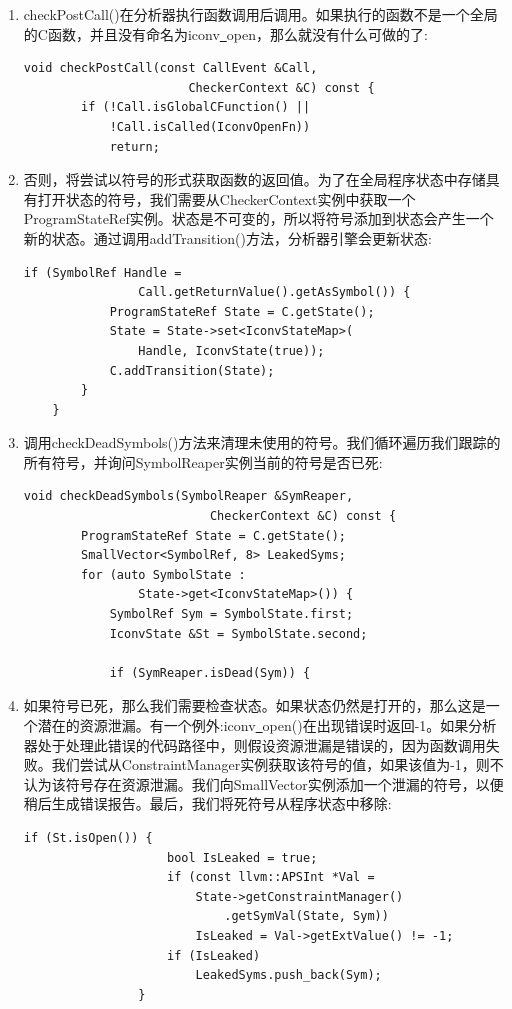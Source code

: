 \begin{enumerate}
\item checkPostCall()在分析器执行函数调用后调用。如果执行的函数不是一个全局的C函数，并且没有命名为iconv\underline{~}open，那么就没有什么可做的了:
\begin{lstlisting}[caption={}]
	void checkPostCall(const CallEvent &Call,
					   CheckerContext &C) const {
		if (!Call.isGlobalCFunction() ||
			!Call.isCalled(IconvOpenFn))
			return;
\end{lstlisting}

\item 否则，将尝试以符号的形式获取函数的返回值。为了在全局程序状态中存储具有打开状态的符号，我们需要从CheckerContext实例中获取一个ProgramStateRef实例。状态是不可变的，所以将符号添加到状态会产生一个新的状态。通过调用addTransition()方法，分析器引擎会更新状态:
\begin{lstlisting}[caption={}]
	if (SymbolRef Handle =
				Call.getReturnValue().getAsSymbol()) {
			ProgramStateRef State = C.getState();
			State = State->set<IconvStateMap>(
				Handle, IconvState(true));
			C.addTransition(State);
		}
	}
\end{lstlisting}

\item 调用checkDeadSymbols()方法来清理未使用的符号。我们循环遍历我们跟踪的所有符号，并询问SymbolReaper实例当前的符号是否已死:\par
\begin{lstlisting}[caption={}]
	void checkDeadSymbols(SymbolReaper &SymReaper,
						  CheckerContext &C) const {
		ProgramStateRef State = C.getState();
		SmallVector<SymbolRef, 8> LeakedSyms;
		for (auto SymbolState :
				State->get<IconvStateMap>()) {
			SymbolRef Sym = SymbolState.first;
			IconvState &St = SymbolState.second;
			
			if (SymReaper.isDead(Sym)) {
\end{lstlisting}

\item 如果符号已死，那么我们需要检查状态。如果状态仍然是打开的，那么这是一个潜在的资源泄漏。有一个例外:iconv\underline{~}open()在出现错误时返回-1。如果分析器处于处理此错误的代码路径中，则假设资源泄漏是错误的，因为函数调用失败。我们尝试从ConstraintManager实例获取该符号的值，如果该值为-1，则不认为该符号存在资源泄漏。我们向SmallVector实例添加一个泄漏的符号，以便稍后生成错误报告。最后，我们将死符号从程序状态中移除:
\begin{lstlisting}[caption={}]
				if (St.isOpen()) {
					bool IsLeaked = true;
					if (const llvm::APSInt *Val =
						State->getConstraintManager()
							.getSymVal(State, Sym))
						IsLeaked = Val->getExtValue() != -1;
					if (IsLeaked)
						LeakedSyms.push_back(Sym);
				}
			

\end{lstlisting}
\end{enumerate}
